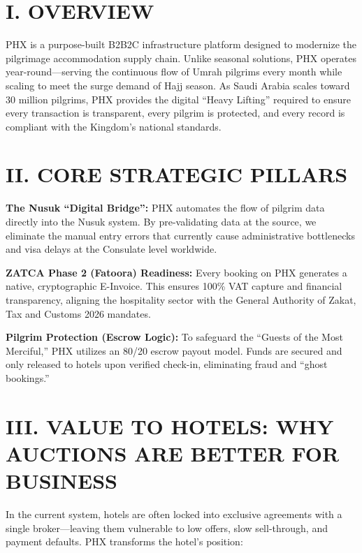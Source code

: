 \documentclass[11pt,a4paper]{article}
\begin{document}
\vspace{1cm}

\section*{I. OVERVIEW}

PHX is a purpose-built B2B2C infrastructure platform designed to modernize the pilgrimage accommodation supply chain. Unlike seasonal solutions, PHX operates year-round---serving the continuous flow of Umrah pilgrims every month while scaling to meet the surge demand of Hajj season. As Saudi Arabia scales toward 30 million pilgrims, PHX provides the digital ``Heavy Lifting'' required to ensure every transaction is transparent, every pilgrim is protected, and every record is compliant with the Kingdom's national standards.

\section*{II. CORE STRATEGIC PILLARS}

\textbf{The Nusuk ``Digital Bridge'':} PHX automates the flow of pilgrim data directly into the Nusuk system. By pre-validating data at the source, we eliminate the manual entry errors that currently cause administrative bottlenecks and visa delays at the Consulate level worldwide.

\vspace{0.4cm}

\textbf{ZATCA Phase 2 (Fatoora) Readiness:} Every booking on PHX generates a native, cryptographic E-Invoice. This ensures 100\% VAT capture and financial transparency, aligning the hospitality sector with the General Authority of Zakat, Tax and Customs 2026 mandates.

\vspace{0.4cm}

\textbf{Pilgrim Protection (Escrow Logic):} To safeguard the ``Guests of the Most Merciful,'' PHX utilizes an 80/20 escrow payout model. Funds are secured and only released to hotels upon verified check-in, eliminating fraud and ``ghost bookings.''

\section*{III. VALUE TO HOTELS: WHY AUCTIONS ARE BETTER FOR BUSINESS}

In the current system, hotels are often locked into exclusive agreements with a single broker---leaving them vulnerable to low offers, slow sell-through, and payment defaults. PHX transforms the hotel's position:
\end{document}
